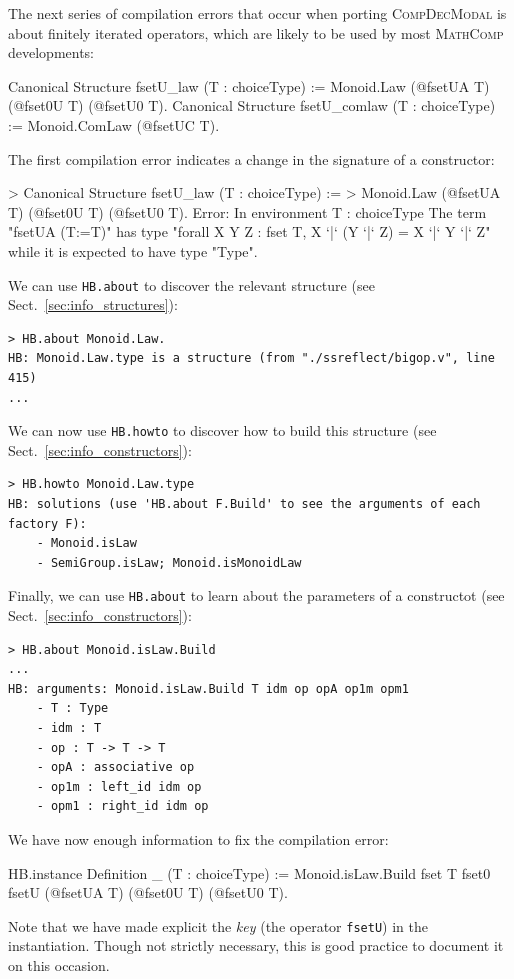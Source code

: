 \documentclass{article}
\def\mathcomp{\textsc{MathComp}}
\def\compdecmodal{\textsc{CompDecModal}}
\def\coqin#1{\texttt{#1}}
\def\newterm#1{{\sl #1}}
\begin{document}
The next series of compilation errors that occur when porting
\compdecmodal{} is about finitely iterated operators, which are likely
to be used by most \mathcomp{} developments:
\begin{failure}
Canonical Structure fsetU_law (T : choiceType) := 
  Monoid.Law (@fsetUA T) (@fset0U T) (@fsetU0 T).
Canonical Structure fsetU_comlaw (T : choiceType) := 
  Monoid.ComLaw (@fsetUC T).
\end{failure}

The first compilation error indicates a change in the signature of a constructor:
\begin{failure}
> Canonical Structure fsetU_law (T : choiceType) := 
>   Monoid.Law (@fsetUA T) (@fset0U T) (@fsetU0 T).
Error:
In environment
T : choiceType
The term "fsetUA (T:=T)" has type "forall X Y Z : {fset T}, X `|` (Y `|` Z) = X `|` Y `|` Z"
while it is expected to have type "Type".
\end{failure}
We can use \coqin{HB.about} to discover the relevant structure (see Sect.~\ref{sec:info_structures}):
\begin{verbatim}
> HB.about Monoid.Law.
HB: Monoid.Law.type is a structure (from "./ssreflect/bigop.v", line 415)
...
\end{verbatim}
We can now use \coqin{HB.howto} to discover how to build this structure (see Sect.~\ref{sec:info_constructors}):
\begin{verbatim}
> HB.howto Monoid.Law.type
HB: solutions (use 'HB.about F.Build' to see the arguments of each factory F):
    - Monoid.isLaw
    - SemiGroup.isLaw; Monoid.isMonoidLaw
\end{verbatim}
Finally, we can use \coqin{HB.about} to learn about the parameters of a constructot (see Sect.~\ref{sec:info_constructors}):
\begin{verbatim}
> HB.about Monoid.isLaw.Build
...
HB: arguments: Monoid.isLaw.Build T idm op opA op1m opm1
    - T : Type
    - idm : T
    - op : T -> T -> T
    - opA : associative op
    - op1m : left_id idm op
    - opm1 : right_id idm op
\end{verbatim}
We have now enough information to fix the compilation error:
\begin{success}
HB.instance Definition _ (T : choiceType) := 
  Monoid.isLaw.Build {fset T} fset0 fsetU (@fsetUA T) (@fset0U T) (@fsetU0 T).  
\end{success}
Note that we have made explicit the \newterm{key} (the operator
\coqin{fsetU}) in the instantiation. Though not strictly necessary, this is
good practice to document it on this occasion.
\end{document}
